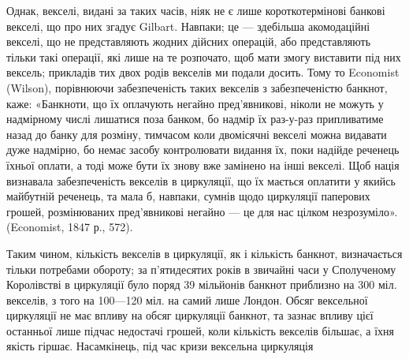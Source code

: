 Однак, векселі, видані за таких часів, ніяк не є лише короткотермінові
банкові векселі, що про них згадує Gilbart. Навпаки; це — здебільша акомодаційні
векселі, що не представляють жодних дійсних операцій, або представляють
тільки такі операції, які лише на те розпочато, щоб мати змогу виставити під них
вексель; прикладів тих двох родів векселів ми подали досить. Тому то Economist
(Wilson), порівнюючи забезпеченість таких векселів з забезпеченістю банкнот,
каже: «Банкноти, що їх оплачують негайно пред’явникові, ніколи не можуть у
надмірному числі лишатися поза банком, бо надмір їх раз-у-раз припливатиме
назад до банку для розміну, тимчасом коли двомісячні векселі можна видавати
дуже надмірно, бо немає засобу контролювати видання їх, поки надійде реченець
їхньої оплати, а тоді може бути їх знову вже замінено на інші векселі. Щоб
нація визнавала забезпеченість векселів в циркуляції, що їх мається оплатити
у якийсь майбутній реченець, та мала б, навпаки, сумнів щодо циркуляції
паперових грошей, розмінюваних пред’явникові негайно — це для нас цілком
незрозуміло». (Economist, 1847 р., 572).

Таким чином, кількість векселів в циркуляції, як і кількість банкнот, визначається
тільки потребами обороту; за п’ятидесятих років в звичайні часи у
Сполученому Королівстві в циркуляції було поряд 39 мільйонів банкнот приблизно
на 300 міл. векселів, з того на 100—120 міл. на самий лише Лондон. Обсяг
вексельної циркуляції не має впливу на обсяг циркуляції банкнот, та зазнає
впливу цієї останньої лише підчас недостачі грошей, коли кількість векселів
більшає, а їхня якість гіршає. Насамкінець, під час кризи вексельна циркуляція
\parbreak{}  %
